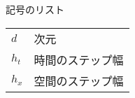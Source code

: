 {\LARGE 記号のリスト}

\begin{table}[htb]
  \begin{tabular}{ll}
    $d$ & 次元 \\
    $h_t$ & 時間のステップ幅 \\
    $h_x$ & 空間のステップ幅 \\
  \end{tabular}
\end{table}